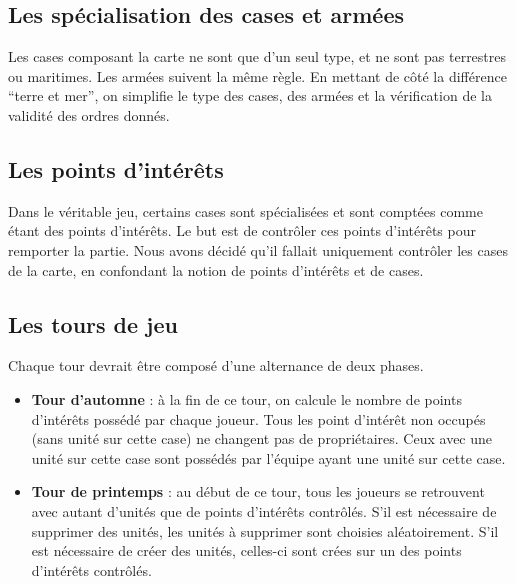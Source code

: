	\subsection{Les spécialisation des cases et armées}
		Les cases composant la carte ne sont que d'un seul type, et ne sont pas terrestres ou maritimes. Les armées suivent la même règle. En mettant de côté la différence \enquote{terre et mer}, on simplifie le type des cases, des armées et la vérification de la validité des ordres donnés.

	\subsection{Les points d'intérêts}
		Dans le véritable jeu, certains cases sont spécialisées et sont comptées comme étant des points d'intérêts. Le but est de contrôler ces points d'intérêts pour remporter la partie. Nous avons décidé qu'il fallait uniquement contrôler les cases de la carte, en confondant la notion de points d'intérêts et de cases.

	\subsection{Les tours de jeu}
		Chaque tour devrait être composé d'une alternance de deux phases.
		\begin{itemize}
			\item \textbf{Tour d’automne} : à la fin de ce tour, on calcule le nombre de points d'intérêts possédé par chaque joueur. Tous les point d'intérêt non occupés (sans unité sur cette case) ne changent pas de propriétaires. Ceux avec une unité sur cette case sont possédés par l'équipe ayant une unité sur cette case.
			\item \textbf{Tour de printemps} : au début de ce tour, tous les joueurs se retrouvent avec autant d'unités que de points d'intérêts contrôlés. S'il est nécessaire de supprimer des unités, les unités à supprimer sont choisies aléatoirement. S'il est nécessaire de créer des unités, celles-ci sont crées sur un des points d'intérêts contrôlés.
		\end{itemize}

